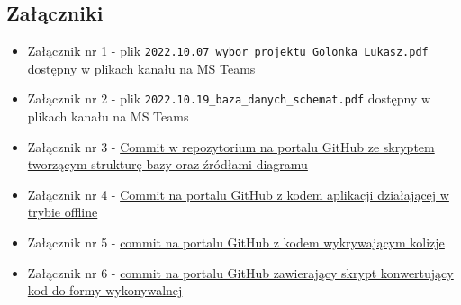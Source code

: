 \documentclass[12pt,a4paper,oneside]{article}
\theoremstyle{definition}
\numberwithin{equation}{section}
\begin{document}
\subsection{Załączniki}
\begin{itemize}
	\item Załącznik nr 1 - plik \lstinline{2022.10.07_wybor_projektu_Golonka_Lukasz.pdf} dostępny w plikach kanału na MS Teams
	\item Załącznik nr 2 - plik \lstinline{2022.10.19_baza_danych_schemat.pdf} dostępny w plikach kanału na MS Teams
	\item Załącznik nr 3 - \href{https://github.com/lukaszgo1/engineering_project_2022/commit/5419869ce748b9493675818fae29f23eee86f69e}{Commit w repozytorium na portalu GitHub ze skryptem tworzącym strukturę bazy oraz źródłami diagramu}
	\item Załącznik nr 4 - \href{https://github.com/lukaszgo1/engineering_project_2022/commit/52f7d987378ff52d6f2d7c7398fcb3154a30066a}{Commit na portalu GitHub z  kodem aplikacji działającej w trybie offline}
	\item Załącznik nr 5 - \href{https://github.com/lukaszgo1/engineering_project_2022/commit/f8553a9d546a3def732eba9f96f4f346f903eddb}{commit na portalu GitHub z kodem wykrywającym kolizje}
	\item Załącznik nr 6 - \href{https://github.com/lukaszgo1/engineering_project_2022/commit/30990652d22c153888666e8b456486dd3c5d86e1}{commit na portalu GitHub zawierający skrypt konwertujący kod do formy wykonywalnej}
\end{itemize}
\end{document}
